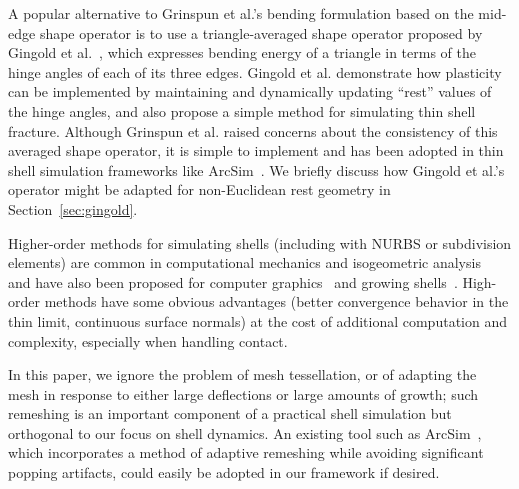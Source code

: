 \documentclass[timestamp,acmtog]{acmart}
\begin{document}
A popular alternative to Grinspun et al.'s bending formulation based on the mid-edge shape operator is to use a triangle-averaged shape operator proposed by Gingold et al.~, which expresses bending energy of a triangle in terms of the hinge angles of each of its three edges. Gingold et al. demonstrate how plasticity can be implemented by maintaining and dynamically updating ``rest'' values of the hinge angles, and also propose a simple method for simulating thin shell fracture. Although Grinspun et al. raised concerns about the consistency of this averaged shape operator, it is simple to implement and has been adopted in thin shell simulation frameworks like ArcSim~\cite{Narain2013}. We briefly discuss how Gingold et al.'s operator might be adapted for non-Euclidean rest geometry in Section~\ref{sec:gingold}.

Higher-order methods for simulating shells (including with NURBS or subdivision elements) are common in computational mechanics and isogeometric analysis~\cite{Batoz1980,Bathe1983,Cirak2000,Kiendl2009,Benson2010,Bandara2018} and have also been proposed for computer graphics~\cite{Wawrzinek2011} and growing shells~\cite{Vetter13}. High-order methods have some obvious advantages (better convergence behavior in the thin limit, continuous surface normals) at the cost of additional computation and complexity, especially when handling contact.

In this paper, we ignore the problem of mesh tessellation, or of adapting the mesh in response to either large deflections or large amounts of growth; such remeshing is an important component of a practical shell simulation but orthogonal to our focus on shell dynamics. An existing tool such as ArcSim~\cite{Narain2012}, which incorporates a method of adaptive remeshing while avoiding significant popping artifacts, could easily be adopted in our framework if desired.
\end{document}
